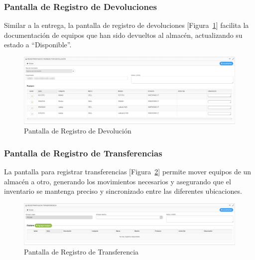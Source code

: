 \documentclass[stu, 12pt, letterpaper, donotrepeattitle, floatsintext, natbib]{apa7}
\begin{document}
\subsubsection{Pantalla de Registro de Devoluciones}
Similar a la entrega, la pantalla de registro de devoluciones [Figura~\ref{devolucion}] facilita la documentaci\'on de equipos que han sido devueltos al almac\'en, actualizando su estado a ``Disponible''.
\begin{figure}[H]
    \centering
    \caption{Pantalla de Registro de Devoluci\'on}\label{devolucion}
    \includegraphics[width=16.5cm]{./images/devolucionEquipo.png}
\end{figure}
\subsubsection{Pantalla de Registro de Transferencias}
La pantalla para registrar transferencias [Figura~\ref{transferencia}] permite mover equipos de un almac\'en a otro, generando los movimientos necesarios y asegurando que el inventario se mantenga preciso y sincronizado entre las diferentes ubicaciones.
\begin{figure}[H]
    \centering
    \caption{Pantalla de Registro de Transferencia}\label{transferencia}
    \includegraphics[width=16.5cm]{./images/transferencia.png}
\end{figure}
\end{document}
